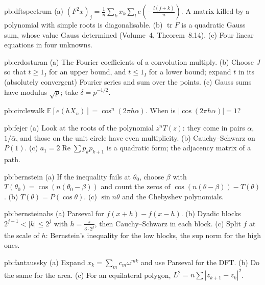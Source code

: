 \begin{hint}{pb:dftspectrum}
(a) $(F^2x)_j=\frac1n\sum_kx_k\sum_le(-\frac{l(j+k)}n)$. A matrix killed by a polynomial with simple roots is diagonalisable. (b) $\operatorname{tr}F$ is a
quadratic Gauss sum, whose value Gauss determined (Volume~4, Theorem~8.14). (c) Four linear equations in four unknowns.
\end{hint}

\begin{hint}{pb:erdosturan}
(a) The Fourier coefficients of a convolution multiply. (b) Choose $J$ so that $t\ge1_I$ for an upper bound, and $t\le1_I$ for a lower
bound; expand $t$ in its (absolutely convergent) Fourier series and sum over the points. (c) Gauss sums have modulus $\sqrt p$;
take $\delta=p^{-1/2}$.
\end{hint}

\begin{hint}{pb:circlewalk}
$\mathbb E[e(hX_n)]=\cos^n(2\pi h\alpha)$. When is $|\cos(2\pi h\alpha)|=1$?
\end{hint}

\begin{hint}{pb:fejer}
(a) Look at the roots of the polynomial $z^nT(z)$: they come in pairs $\alpha$, $1/\bar\alpha$, and those on the unit circle have even
multiplicity. (b) Cauchy--Schwarz on $P(1)$. (c) $a_1=2\operatorname{Re}\sum p_kp_{k+1}$ is a quadratic form; the adjacency matrix of a path.
\end{hint}

\begin{hint}{pb:bernstein}
(a) If the inequality fails at $\theta_0$, choose $\beta$ with $T(\theta_0)=\cos(n(\theta_0-\beta))$ and count the zeros of $\cos(n(\theta-\beta))-T(\theta)$. (b) $T(\theta)=P(\cos\theta)$.
(c) $\sin n\theta$ and the Chebyshev polynomials.
\end{hint}

\begin{hint}{pb:bernsteinabs}
(a) Parseval for $f(x+h)-f(x-h)$. (b) Dyadic blocks $2^{j-1}<|k|\le2^j$ with $h=\frac\pi{3\cdot2^j}$, then Cauchy--Schwarz in each block. (c) Split
$f$ at the scale of $h$: Bernstein's inequality for the low blocks, the sup norm for the high ones.
\end{hint}

\begin{hint}{pb:fantaussky}
(a) Expand $x_k=\sum_mc_m\omega^{mk}$ and use Parseval for the DFT. (b) Do the same for the area. (c) For an equilateral polygon,
$L^2=n\sum|z_{k+1}-z_k|^2$.
\end{hint}

